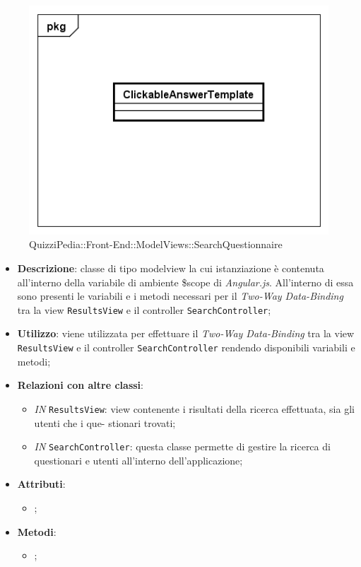 	\begin{figure}[ht]
		\centering
		\includegraphics[scale=0.5,keepaspectratio]{UML/Classi/Front-End/QuizziPedia_Front-end_Templates_ClickableAnswerTemplate.png}
		\caption{QuizziPedia::Front-End::ModelViews::SearchQuestionnaire}
	\end{figure} \FloatBarrier
	
	\begin{itemize}
		\item \textbf{Descrizione}: classe di tipo modelview la cui istanziazione è contenuta all'interno della variabile di ambiente \$scope di \textit{Angular.js}. All'interno di essa sono presenti le variabili e i metodi necessari per il \textit{Two-Way Data-Binding} tra la view \texttt{ResultsView} e il controller \texttt{SearchController};
		\item \textbf{Utilizzo}: viene utilizzata per effettuare il \textit{Two-Way Data-Binding} tra la view \texttt{ResultsView} e il controller \texttt{SearchController} rendendo disponibili variabili e metodi;
		\item \textbf{Relazioni con altre classi}: 
		\begin{itemize}
			\item \textit{IN} \texttt{ResultsView}: view contenente i risultati della ricerca effettuata, sia gli utenti che i que- stionari trovati; 
			\item \textit{IN} \texttt{SearchController}: questa classe permette di gestire la ricerca di questionari e utenti all’interno dell’applicazione;
		\end{itemize}
		\item \textbf{Attributi}: 
		\begin{itemize}
			\item ;
		\end{itemize}
		\item \textbf{Metodi}: 
		\begin{itemize}
			\item ;
		\end{itemize}
	\end{itemize}
	

